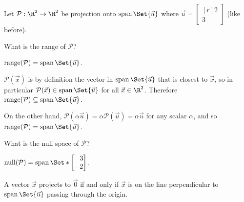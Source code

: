 \documentclass{problemset}
\DeclareMathOperator{\Span}{span}
\DeclareMathOperator{\Range}{range}
\DeclareMathOperator{\Null}{null}
\newcommand{\mat}[1]{\begin{bmatrix*}[r]#1\end{bmatrix*}}
\begin{document}
	\question
	Let $\mathcal P:\R^2\to\R^2$ be projection onto $\Span\Set{\vec u}$ where
	$\vec u=\mat{2\\3}$ (like before).
	\begin{parts}
		\item What is the range of $\mathcal P$?
			\begin{solution}
				$\Range(\mathcal P)=\Span\Set{\vec u}$.

				$\mathcal P(\vec x)$ is by definition the vector in $\Span\Set{\vec u}$ 
				that is closest to $\vec x$, so in particular 
				$\mathcal P(\vec x) \in \Span\Set{\vec u}$ for all $\vec x\in\R^2$.
				Therefore $\Range(\mathcal P)\subseteq\Span\Set{\vec u}$. 
				
				On the other hand, $\mathcal P(\alpha \vec u)=\alpha\mathcal P(\vec u)=\alpha\vec u$ 
				for any scalar $\alpha$, and so $\Range(\mathcal P)=\Span\Set{\vec u}$.
			\end{solution}
		\item What is the null space of $\mathcal P$?
			\begin{solution}
				\begin{solution}
					$\Null(\mathcal P)=\Span\Set*{\mat{3\\-2}}$.

					A vector $\vec x$ projects to $\vec 0$ if and only if $\vec x$
					is on the line perpendicular to $\Span\Set{\vec u}$ passing
					through the origin. 
				\end{solution}
			\end{solution}
	\end{parts}
\end{document}
